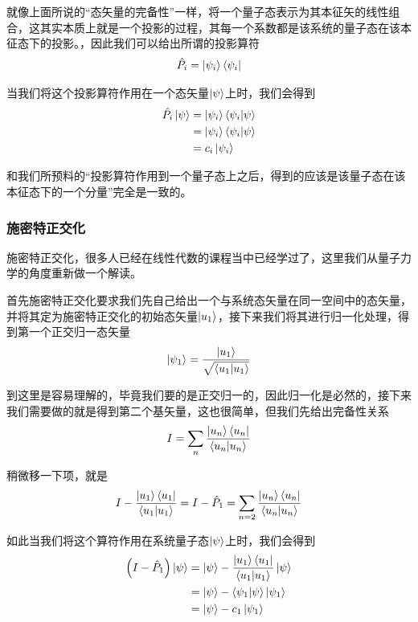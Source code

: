 \documentclass{article}
\begin{document}
就像上面所说的“态矢量的完备性”一样，将一个量子态表示为其本征矢的线性组合，这其实本质上就是一个投影的过程，其每一个系数都是该系统的量子态在该本征态下的投影。，因此我们可以给出所谓的投影算符
\begin{equation*}
	\hat{P_i}=\ket{\psi_i}\bra{\psi_i}
\end{equation*}

当我们将这个投影算符作用在一个态矢量$\ket{\psi}$上时，我们会得到
\begin{align*}
	\hat{P_i}\ket{\psi} & =\ket{\psi_i}\bra{\psi_i}\ket{\psi}       \\
	                   & =\ket{\psi_i}\braket{\psi_i}{\psi}        \\
	                   & =c_i\ket{\psi_i}
\end{align*}

和我们所预料的“投影算符作用到一个量子态上之后，得到的应该是该量子态在该本征态下的一个分量”完全是一致的。



\subsubsection{施密特正交化}

施密特正交化，很多人已经在线性代数的课程当中已经学过了，这里我们从量子力学的角度重新做一个解读。

首先施密特正交化要求我们先自己给出一个与系统态矢量在同一空间中的态矢量，并将其定为施密特正交化的初始态矢量$\ket{u_1}$，接下来我们将其进行归一化处理，得到第一个正交归一态矢量
\begin{equation*}
	\ket{\psi_1}=\frac{\ket{u_1}}{\sqrt{\braket{u_1}{u_1}}}
\end{equation*}

到这里是容易理解的，毕竟我们要的是正交归一的，因此归一化是必然的，接下来我们需要做的就是得到第二个基矢量，这也很简单，但我们先给出完备性关系
\begin{equation*}
	I=\sum_n \frac{\ket{u_n}\bra{u_n}}{\braket{u_n}{u_n}}
\end{equation*}

稍微移一下项，就是 
\begin{equation*}
	I - \frac{\ket{u_1}\bra{u_1}}{\braket{u_1}{u_1}} = I- \hat{P}_1= \sum_{n=2} \frac{\ket{u_n}\bra{u_n}}{\braket{u_n}{u_n}}
\end{equation*}

如此当我们将这个算符作用在系统量子态$\ket{\psi}$上时，我们会得到
\begin{align*}
	\left(I- \hat{P}_1\right)\ket{\psi} & = \ket{\psi} - \frac{\ket{u_1}\bra{u_1}}{\braket{u_1}{u_1}}\ket{\psi} \\
	                                   & = \ket{\psi} - \braket{\psi_1}{\psi}\ket{\psi_1}               \\
	                                   & = \ket{\psi} - c_1\ket{\psi_1}
\end{align*}
\end{document}
